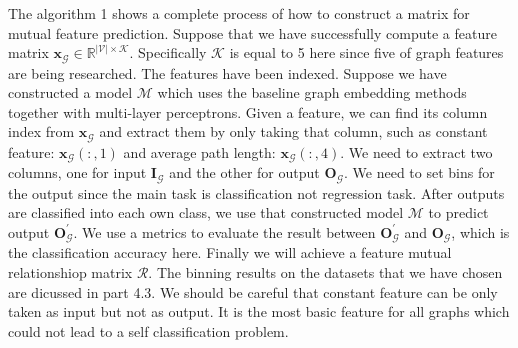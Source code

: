 \documentclass[sigconf]{acmart}
\begin{document}
The algorithm 1 shows a complete process of how to construct a matrix for mutual feature prediction. Suppose that
we have successfully compute a feature matrix $\textbf{x}_{\mathcal G} \in  \mathbb{R}^{|\mathcal{V}|\times \mathcal K}$.
Specifically $\mathcal K$ is equal to 5 here since five of graph features are being researched. The features have been indexed. Suppose we have constructed 
a model $\mathcal M$ which uses the baseline graph embedding methods together with multi-layer perceptrons. 
Given a feature, we can find its column index from $\textbf{x}_{\mathcal G}$ and extract them by only taking that column,
such as constant feature: $\textbf{x}_{\mathcal G}(:,1)$ and average path length: $\textbf{x}_{\mathcal G}(:,4)$. We need to extract two columns, one
for input $\textbf{I}_{\mathcal G}$ and the other for output $\textbf{O}_{\mathcal G}$. We need to set bins for the output since the main task is classification not regression task. After outputs are classified into 
each own class, we use that constructed model $\mathcal M$ to predict output  $\textbf{O}^{'}_{\mathcal G}$. We use a metrics to evaluate the result between 
$\textbf{O}^{'}_{\mathcal G}$ and $\textbf{O}_{\mathcal G}$, which is the classification accuracy here. 
Finally we will achieve a feature mutual relationshiop matrix $\mathcal R$.
The binning results on the datasets that we have chosen are dicussed in part 4.3. We should be careful that constant feature can be only 
taken as input but not as output. It is the most basic feature for all graphs which could not lead to a self classification problem.
\end{document}
